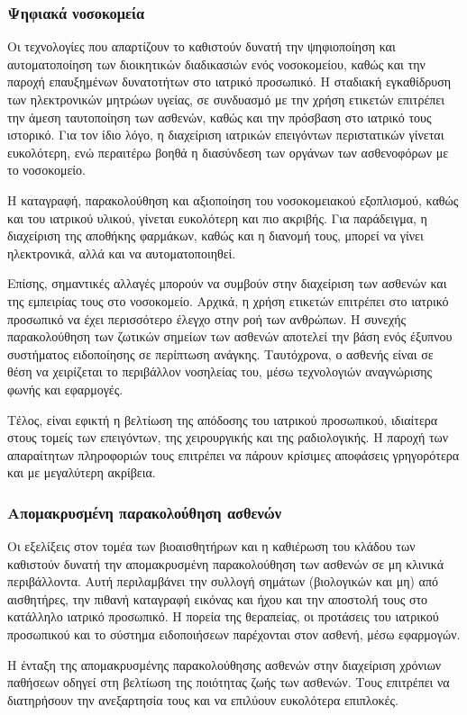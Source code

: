 \subsubsection{Ψηφιακά νοσοκομεία}
Οι τεχνολογίες που απαρτίζουν το  καθιστούν δυνατή την ψηφιοποίηση και αυτοματοποίηση των διοικητικών διαδικασιών ενός νοσοκομείου, καθώς και την παροχή επαυξημένων δυνατοτήτων στο ιατρικό προσωπικό.
Η σταδιακή εγκαθίδρυση των ηλεκτρονικών μητρώων υγείας, σε συνδυασμό με την χρήση ετικετών  επιτρέπει την άμεση ταυτοποίηση των ασθενών, καθώς και την πρόσβαση στο ιατρικό τους ιστορικό.
Για τον ίδιο λόγο, η διαχείριση ιατρικών επειγόντων περιστατικών γίνεται ευκολότερη, ενώ περαιτέρω βοηθά η διασύνδεση των οργάνων των ασθενοφόρων με το νοσοκομείο.
\par
Η καταγραφή, παρακολούθηση και αξιοποίηση του νοσοκομειακού εξοπλισμού, καθώς και του ιατρικού υλικού, γίνεται ευκολότερη και πιο ακριβής.
Για παράδειγμα, η διαχείριση της αποθήκης φαρμάκων, καθώς και η διανομή τους, μπορεί να γίνει ηλεκτρονικά, αλλά και να αυτοματοποιηθεί.
\par
Επίσης, σημαντικές αλλαγές μπορούν να συμβούν στην διαχείριση των ασθενών και της εμπειρίας τους στο νοσοκομείο.
Αρχικά, η χρήση ετικετών  επιτρέπει στο ιατρικό προσωπικό να έχει περισσότερο έλεγχο στην ροή των ανθρώπων.
Η συνεχής παρακολούθηση των ζωτικών σημείων των ασθενών αποτελεί την βάση ενός έξυπνου συστήματος ειδοποίησης σε περίπτωση ανάγκης.
Ταυτόχρονα, ο ασθενής είναι σε θέση να χειρίζεται το περιβάλλον νοσηλείας του, μέσω τεχνολογιών αναγνώρισης φωνής και  εφαρμογές.
\par
Τέλος, είναι εφικτή η βελτίωση της απόδοσης του ιατρικού προσωπικού, ιδιαίτερα στους τομείς των επειγόντων, της χειρουργικής και της ραδιολογικής.
Η παροχή των απαραίτητων πληροφοριών τους επιτρέπει να πάρουν κρίσιμες αποφάσεις γρηγορότερα και με μεγαλύτερη ακρίβεια.
\subsubsection{Απομακρυσμένη παρακολούθηση ασθενών}
Οι εξελίξεις στον τομέα των βιοαισθητήρων και η καθιέρωση του κλάδου των  καθιστούν δυνατή την απομακρυσμένη παρακολούθηση των ασθενών σε μη κλινικά περιβάλλοντα.
Αυτή περιλαμβάνει την συλλογή σημάτων (βιολογικών και μη) από αισθητήρες, την πιθανή καταγραφή εικόνας και ήχου και την αποστολή τους στο κατάλληλο ιατρικό προσωπικό.
Η πορεία της θεραπείας, οι προτάσεις του ιατρικού προσωπικού και το σύστημα ειδοποιήσεων παρέχονται στον ασθενή, μέσω  εφαρμογών.
\par
Η ένταξη της απομακρυσμένης παρακολούθησης ασθενών στην διαχείριση χρόνιων παθήσεων οδηγεί στη βελτίωση της ποιότητας ζωής των ασθενών.
Τους επιτρέπει να διατηρήσουν την ανεξαρτησία τους και να επιλύουν ευκολότερα επιπλοκές.